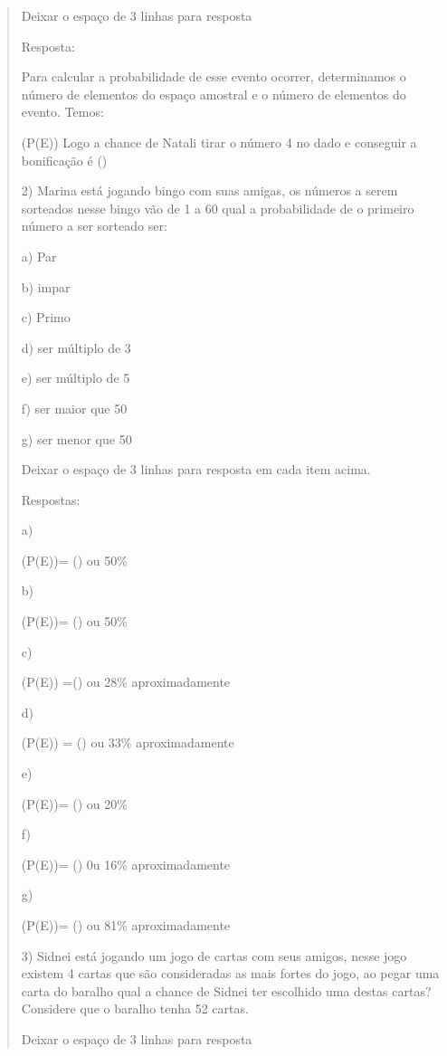 \begin{quote}
\begin{escolha}
Deixar o espaço de 3 linhas para resposta

Resposta:

Para calcular a probabilidade de esse evento ocorrer, determinamos o
número de elementos do espaço amostral e o número de elementos do
evento. Temos:

(P(E)) Logo a chance de Natali tirar o número 4 no
dado e conseguir a bonificação é ()

2) Marina está jogando bingo com suas amigas, os números a serem
sorteados nesse bingo vão de 1 a 60 qual a probabilidade de o primeiro
número a ser sorteado ser:

a) Par

b) impar

c) Primo

d) ser múltiplo de 3

e) ser múltiplo de 5

f) ser maior que 50

g) ser menor que 50

Deixar o espaço de 3 linhas para resposta em cada item acima.

Respostas:

a)

(P(E))= () ou 50\%

b)

(P(E))= () ou 50\%

c)

(P(E)) =() ou 28\% aproximadamente

d)

(P(E)) = () ou 33\% aproximadamente

e)

(P(E))= () ou 20\%

f)

(P(E))= () 0u 16\% aproximadamente

g)

(P(E))= () ou 81\% aproximadamente

3) Sidnei está jogando um jogo de cartas com seus amigos, nesse jogo
existem 4 cartas que são consideradas as mais fortes do jogo, ao pegar
uma carta do baralho qual a chance de Sidnei ter escolhido uma destas
cartas? Considere que o baralho tenha 52 cartas.

Deixar o espaço de 3 linhas para resposta


\end{escolha}
\end{quote}
